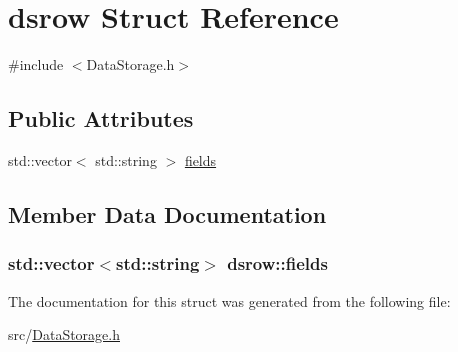 \hypertarget{structdsrow}{
\section{dsrow Struct Reference}
\label{da/d2e/structdsrow}
}


{\ttfamily \#include $<$DataStorage.h$>$}

\subsection*{Public Attributes}
\begin{DoxyCompactItemize}
\item 
std::vector$<$ std::string $>$ \hyperlink{structdsrow_ac1d896aabe6db8bd67fefe4f8e970960}{fields}
\end{DoxyCompactItemize}


\subsection{Member Data Documentation}
\hypertarget{structdsrow_ac1d896aabe6db8bd67fefe4f8e970960}{
\subsubsection[{fields}]{\setlength{\rightskip}{0pt plus 5cm}std::vector$<$std::string$>$ {\bf dsrow::fields}}}
\label{da/d2e/structdsrow_ac1d896aabe6db8bd67fefe4f8e970960}


The documentation for this struct was generated from the following file:\begin{DoxyCompactItemize}
\item 
src/\hyperlink{DataStorage_8h}{DataStorage.h}\end{DoxyCompactItemize}
